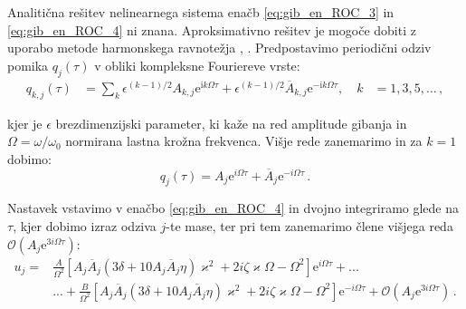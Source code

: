         Analitična rešitev nelinearnega sistema enačb \eqref{eq:gib_en_ROC_3} in \eqref{eq:gib_en_ROC_4} ni znana. Aproksimativno rešitev je mogoče dobiti z uporabo metode harmonskega ravnotežja \cite{huang2016harmonic}, \cite{thomsen2003vibrations}. Predpostavimo periodični odziv pomika $q_j(\tau)$ v obliki kompleksne Fouriereve vrste: 
        \begin{equation}
        \begin{aligned}
            q_{k, j}(\tau) &=\sum_k \epsilon^{(k-1) / 2} A_{k, j} \mathrm{e}^{\mathrm{i} k \Omega \tau}+\epsilon^{(k-1) / 2} \overline{A}_{k, j} \mathrm{e}^{-\mathrm{i} k \Omega \tau}, \quad k &=1, 3, 5, \ldots \,, 
        \end{aligned}
        \end{equation}
        
        kjer je $\epsilon$ brezdimenzijski parameter, ki kaže na red amplitude gibanja in $\Omega=\omega/\omega_0$ normirana lastna krožna frekvenca. Višje rede zanemarimo in za $k=1$ dobimo:
        \begin{equation}\label{eq:nastavek_qj}
            q_j(\tau)=A_j \mathrm{e}^{i\Omega \tau}+\overline{A}_j \mathrm{e}^{-i\Omega \tau} \,.
        \end{equation}
        
        Nastavek vstavimo v enačbo \eqref{eq:gib_en_ROC_4} in dvojno integriramo glede na $\tau$, kjer dobimo izraz odziva $j$-te mase, ter pri tem zanemarimo člene višjega reda $\mathcal{O}(A_j \mathrm{e}^{3 i \Omega \tau})$:
        \begin{align}\label{eq:nastavek_uj}
            u_j=&\frac{A}{\Omega^2}\left[ A_j \overline{A}_j (3\delta+10 A_j \overline{A}_j \eta)\varkappa^2 + 2 i \zeta \varkappa \Omega-\Omega^2 \right]  \mathrm{e}^{i \Omega \tau} + ...\nonumber\\
            & ... + \frac{B}{\Omega^2}\left[ A_j \overline{A}_j (3\delta+10 A_j \overline{A}_j \eta)\varkappa^2 + 2 i \zeta \varkappa \Omega-\Omega^2 \right] \mathrm{e}^{-i \Omega \tau}  + \mathcal{O}(A_j \mathrm{e}^{3 i \Omega \tau}) \,.
        \end{align}
        
